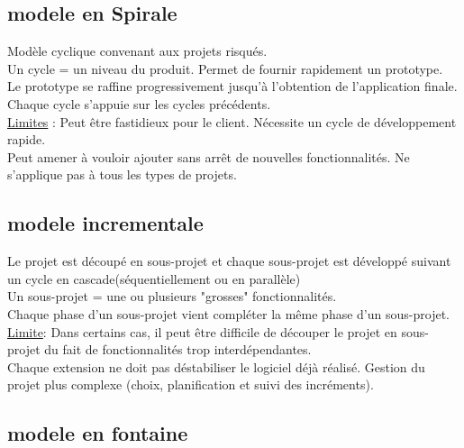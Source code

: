 \documentclass[a4paper,12pt,openany]{book}
\begin{document}
\subsection{modele en Spirale}

Modèle cyclique convenant aux projets risqués.\\
Un cycle = un niveau du produit. Permet de fournir rapidement un prototype.\\
Le prototype se raffine progressivement jusqu'à l'obtention de l'application finale. Chaque cycle s'appuie sur les cycles précédents.\\ 


\underline{Limites} : Peut être fastidieux pour le client. Nécessite un cycle de développement rapide.\\
Peut amener à vouloir ajouter sans arrêt de nouvelles fonctionnalités. Ne s'applique pas à tous les types de projets.\\


\subsection{modele incrementale}

Le projet est découpé en sous-projet et chaque sous-projet est développé suivant un cycle en cascade(séquentiellement ou en parallèle)\\Un sous-projet = une ou plusieurs "grosses" fonctionnalités.\\
Chaque phase d’un sous-projet vient compléter la même phase d’un sous-projet.\\

\underline{Limite}: Dans certains cas, il peut être difficile de découper le projet en sous-projet du fait de fonctionnalités trop interdépendantes.\\
Chaque extension ne doit pas déstabiliser le logiciel déjà réalisé. Gestion du projet plus complexe (choix, planification et suivi des incréments).\\



\subsection{modele en fontaine}



\newpage
\end{document}
